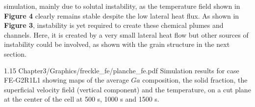 simulation, mainly due to solutal instability, as the temperature field shown in \textbf{Figure 4 }clearly remains stable despite 
the low lateral heat flux. As shown in \textbf{Figure 3}, instability is yet required to create these chemical plumes and channels. 
Here, it is created by a very small lateral heat flow but other sources of instability could be involved, as shown with the grain structure in the next section.
%
\begin{landscape}
\begin{figureth}
{1.15}
{Chapter3/Graphics/freckle_fe/planche_fe.pdf}
{Simulation results for case FE-G2R1L1 showing maps of the average $Ga$ composition,
the solid fraction, the superficial velocity field (vertical component) and the temperature, 
on a cut plane at the center of the cell at 500 s, 1000 s and 1500 s.}
\label{fig:planche_fe}
\end{figureth}
\end{landscape}
%
